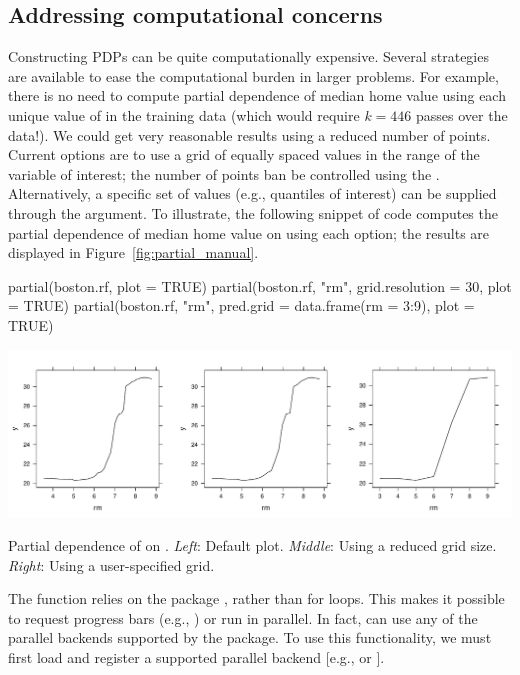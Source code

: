 \subsection{Addressing computational concerns}

Constructing PDPs can be quite computationally expensive. Several strategies are available to ease the computational burden in larger problems. For example, there is no need to compute partial dependence of median home value using each unique value of  in the training data (which would require $k = 446$ passes over the data!). We could get very reasonable results using a reduced number of points. Current options are to use a grid of equally spaced values in the range of the variable of interest; the number of points ban be controlled using the . Alternatively, a specific set of values (e.g., quantiles of interest) can be supplied through the  argument. To illustrate, the following snippet of code computes the partial dependence of median home value on  using each option; the results are displayed in Figure~\ref{fig:partial_manual}.
\begin{example}
partial(boston.rf, plot = TRUE)
partial(boston.rf, "rm", grid.resolution = 30, plot = TRUE)
partial(boston.rf, "rm", pred.grid = data.frame(rm = 3:9), plot = TRUE)
\end{example}

\begin{widefigure}[htbp]
  \centering
  \includegraphics[width=0.8\linewidth]{partial_manual}
  \caption{Partial dependence of  on . \textit{Left}: Default plot. \textit{Middle}: Using a reduced grid size. \textit{Right}: Using a user-specified grid.}
  \label{fig:partial_manual}
\end{widefigure}

The  function relies on the  package \citep{plyr-pkg}, rather than for loops. This makes it possible to request progress bars (e.g., ) or run  in parallel. In fact,  can use any of the parallel backends supported by the  package. To use this functionality, we must first load and register a supported parallel backend [e.g.,  \citep{doMC-pkg} or  \citep{doParallel-pkg}].


